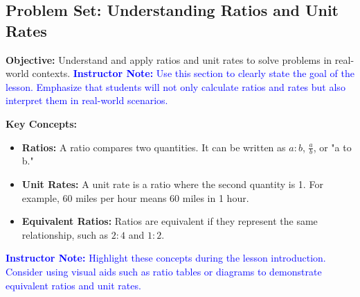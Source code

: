 \documentclass[12pt]{article}
\title{}
\date{}
\begin{document}
\subsection*{Problem Set: Understanding Ratios and Unit Rates}
\onehalfspacing

\begin{tcolorbox}[colframe=black!40, colback=gray!5, 
coltitle=black, colbacktitle=black!20, fonttitle=\bfseries\Large, 
title=Learning Objective, halign title=center, left=5pt, right=5pt, top=5pt, bottom=15pt]
\textbf{Objective:} Understand and apply ratios and unit rates to solve problems in real-world contexts.  
\textcolor{blue}{\textbf{Instructor Note:} Use this section to clearly state the goal of the lesson. Emphasize that students will not only calculate ratios and rates but also interpret them in real-world scenarios.}
\end{tcolorbox}

\begin{tcolorbox}[colframe=black!60, colback=white, 
coltitle=black, colbacktitle=black!15, fonttitle=\bfseries\Large, 
title=Key Concepts and Vocabulary, halign title=center, left=10pt, right=10pt, top=10pt, bottom=15pt]
\textbf{Key Concepts:}
\begin{itemize}
    \item \textbf{Ratios:} A ratio compares two quantities. It can be written as \( a:b \), \( \frac{a}{b} \), or "a to b."
    \item \textbf{Unit Rates:} A unit rate is a ratio where the second quantity is 1. For example, 60 miles per hour means 60 miles in 1 hour.
    \item \textbf{Equivalent Ratios:} Ratios are equivalent if they represent the same relationship, such as \( 2:4 \) and \( 1:2 \).
\end{itemize}
\textcolor{blue}{\textbf{Instructor Note:} Highlight these concepts during the lesson introduction. Consider using visual aids such as ratio tables or diagrams to demonstrate equivalent ratios and unit rates.}
\end{tcolorbox}
\end{document}

